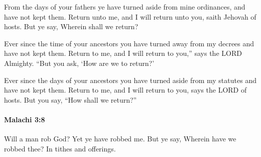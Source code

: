 			\begin{versebox}
					\item[BHS] 
					\item[LXX] 
					\item[ASV] From the days of your fathers ye have turned aside from mine ordinances, and have not kept them. Return unto me, and I will return unto you, saith Jehovah of hosts. But ye say, Wherein shall we return?
					\item[NIV] Ever since the time of your ancestors you have turned away from my decrees and have not kept them. Return to me, and I will return to you,” says the LORD Almighty. “But you ask, ‘How are we to return?’
					\item[NRSV] Ever since the days of your ancestors you have turned aside from my statutes and have not kept them. Return to me, and I will return to you, says the LORD of hosts. But you say, “How shall we return?”
			\end{versebox}

		\paragraph{Malachi 3:8} %
			\label{MALACHI-3-8}

			Will a man rob God? Yet ye have robbed me. But ye say, Wherein have we robbed thee? In tithes and offerings.

